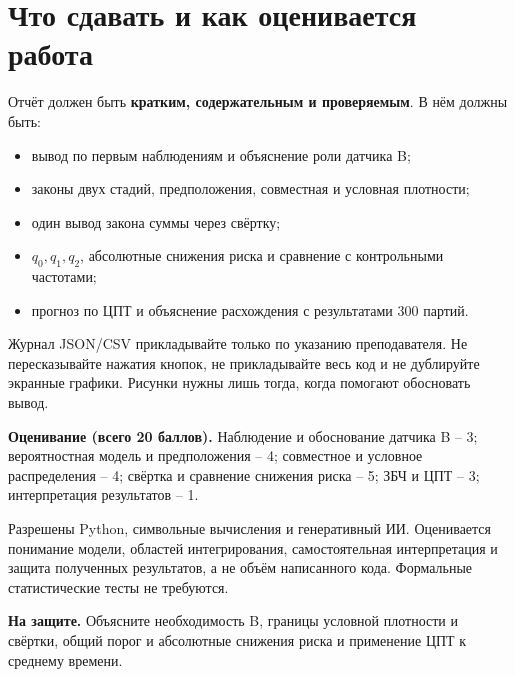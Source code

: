 \documentclass[12pt,a4paper]{article}
\begin{document}
\section{Что сдавать и как оценивается работа}
Отчёт должен быть \textbf{кратким, содержательным и проверяемым}. В нём должны быть:
\begin{itemize}[topsep=4pt,itemsep=2pt]
\item вывод по первым наблюдениям и объяснение роли датчика B;
\item законы двух стадий, предположения, совместная и условная плотности;
\item один вывод закона суммы через свёртку;
\item \(q_0,q_1,q_2\), абсолютные снижения риска и сравнение с контрольными частотами;
\item прогноз по ЦПТ и объяснение расхождения с результатами 300 партий.
\end{itemize}
Журнал JSON/CSV прикладывайте только по указанию преподавателя. Не пересказывайте нажатия кнопок, не прикладывайте весь код и не дублируйте экранные графики. Рисунки нужны лишь тогда, когда помогают обосновать вывод.

\begin{studentnote}
\textbf{Оценивание (всего 20 баллов).} Наблюдение и обоснование датчика B – 3; вероятностная модель и предположения – 4; совместное и условное распределения – 4; свёртка и сравнение снижения риска – 5; ЗБЧ и ЦПТ – 3; интерпретация результатов – 1.
\end{studentnote}
Разрешены Python, символьные вычисления и генеративный ИИ. Оценивается понимание модели, областей интегрирования, самостоятельная интерпретация и защита полученных результатов, а не объём написанного кода. Формальные статистические тесты не требуются.

\par\smallskip\noindent\textbf{На защите.} Объясните необходимость B, границы условной плотности и свёртки, общий порог и абсолютные снижения риска и применение ЦПТ к среднему времени.
\end{document}
